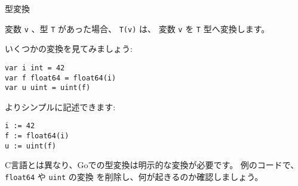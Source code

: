 {\large 型変換}

変数 \texttt{v} 、型 \texttt{T} があった場合、 \texttt{T(v)} は、
変数 \texttt{v} を \texttt{T} 型へ変換します。

いくつかの変換を見てみましょう:

\begin{lstlisting}[numbers=none]
var i int = 42
var f float64 = float64(i)
var u uint = uint(f)
\end{lstlisting}

よりシンプルに記述できます:

\begin{lstlisting}[numbers=none]
i := 42
f := float64(i)
u := uint(f)
\end{lstlisting}

C言語とは異なり、Goでの型変換は明示的な変換が必要です。
例のコードで、 \texttt{float64} や \texttt{uint} の変換
を削除し、何が起きるのか確認しましょう。